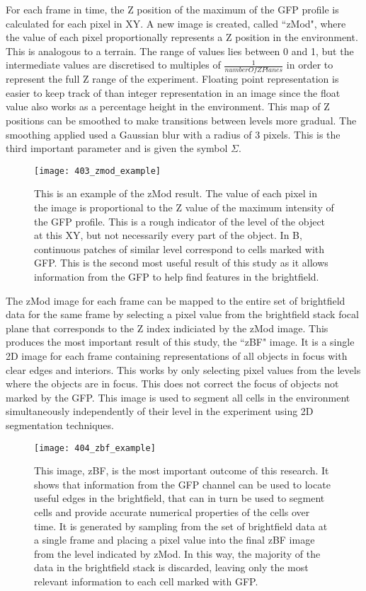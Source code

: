 For each frame in time, the Z position of the maximum of the GFP profile is calculated for each pixel in XY. A new image is created, called ``zMod", where the value of each pixel proportionally represents a Z position in the environment. This is analogous to a terrain. The range of values lies between 0 and 1, but the intermediate values are discretised to multiples of $\frac{1}{numberOfZPlanes}$ in order to represent the full Z range of the experiment. Floating point representation is easier to keep track of than integer representation in an image since the float value also works as a percentage height in the environment. This map of Z positions can be smoothed to make transitions between levels more gradual. The smoothing applied used a Gaussian blur with a radius of 3 pixels. This is the third important parameter and is given the symbol $\Sigma$.

\begin{figure}[h!]
 \centering
 \texttt{[image: 403\_zmod\_example]}
 \caption[zMod example]{
 	This is an example of the zMod result. The value of each pixel in the image is proportional to the Z value of the maximum intensity of the GFP profile. This is a rough indicator of the level of the object at this XY, but not necessarily every part of the object. In B, continuous patches of similar level correspond to cells marked with GFP. This is the second most useful result of this study as it allows information from the GFP to help find features in the brightfield.
 }
 \label{fig:zmodexample}
\end{figure}

The zMod image for each frame can be mapped to the entire set of brightfield data for the same frame by selecting a pixel value from the brightfield stack focal plane that corresponds to the Z index indiciated by the zMod image. This produces the most important result of this study, the ``zBF" image. It is a single 2D image for each frame containing representations of all objects in focus with clear edges and interiors. This works by only selecting pixel values from the levels where the objects are in focus. This does not correct the focus of objects not marked by the GFP. This image is used to segment all cells in the environment simultaneously independently of their level in the experiment using 2D segmentation techniques.

\begin{figure}[h!]
 \centering
 \texttt{[image: 404\_zbf\_example]}
 \caption[zBF example]{
 	This image, zBF, is the most important outcome of this research. It shows that information from the GFP channel can be used to locate useful edges in the brightfield, that can in turn be used to segment cells and provide accurate numerical properties of the cells over time. It is generated by sampling from the set of brightfield data at a single frame and placing a pixel value into the final zBF image from the level indicated by zMod. In this way, the majority of the data in the brightfield stack is discarded, leaving only the most relevant information to each cell marked with GFP.
 }
 \label{fig:zbf}
\end{figure}

